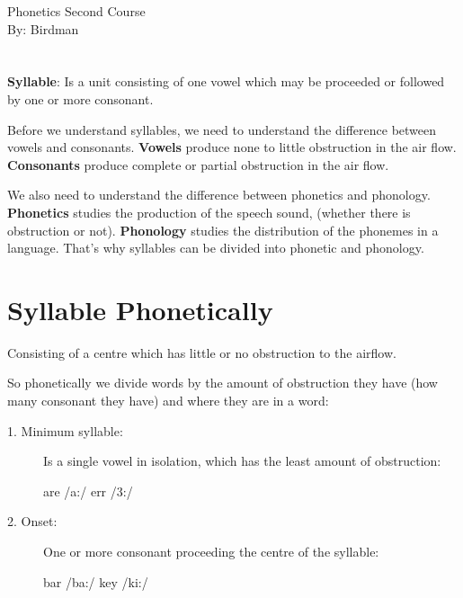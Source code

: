 \documentclass[12pt, a4paper]{memoir}
\begin{document}
\begin{center}
\huge{Phonetics Second Course}\\[0.5cm]
\Large{By: Birdman}\\[1cm]
\end{center}


\section*{}

{\fontpar
\textbf{Syllable}: Is a unit consisting of one vowel which may be 
proceeded or followed by one or more consonant.\bigbreak

Before we understand syllables, we need to understand the 
difference between vowels and consonants. \textbf{Vowels} produce none to 
little obstruction in the air flow. \textbf{Consonants} produce 
complete or partial obstruction in the air flow.\bigbreak

We also need to understand the difference between phonetics and phonology.
\textbf{Phonetics} studies the production of the speech sound, (whether
there is obstruction or not). \textbf{Phonology} studies the distribution
of the phonemes in a language. That's why syllables can be divided into
phonetic and phonology.

\section*{Syllable Phonetically}
Consisting of a centre which has little or no obstruction to the 
airflow.\medbreak

So phonetically we divide words by the amount of obstruction they have 
(how many consonant they have) and where they are in a word:


\begin{description}
  \item[1. Minimum syllable:]Is a single vowel in isolation, which has
    the least amount of obstruction:\medbreak

    \centerline{are /a:/ \hspace{2cm} err /3:/ }

  \item[2. Onset:]One or more consonant proceeding the centre of
    the syllable:\medbreak

    \centerline{bar /ba:/ \hspace{2cm} key /ki:/}


\end{description}}
\end{document}
